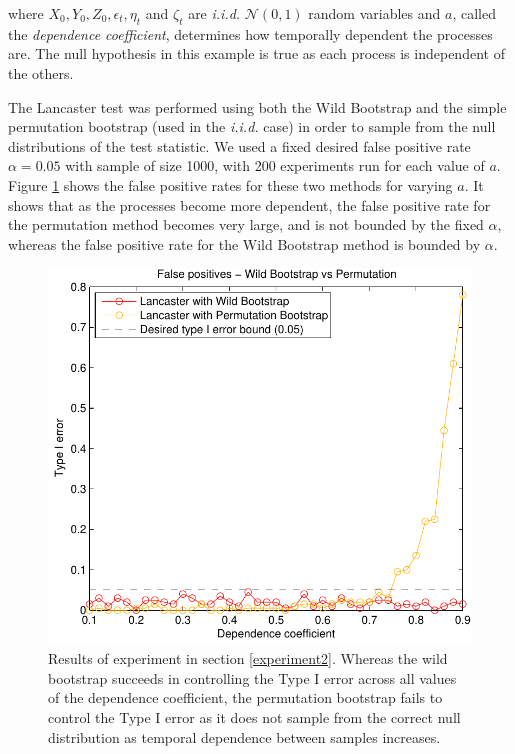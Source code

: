 \documentclass[]{article}
\begin{document}
where $X_0, Y_0, Z_0, \epsilon_t, \eta_t$ and $\zeta_t$ are \emph{i.i.d.} $\mathcal{N}(0,1)$ random variables and $a$, called the \emph{dependence coefficient}, determines how temporally dependent the processes are. The null hypothesis in this example is true as each process is independent of the others.

The Lancaster test was performed using both the Wild Bootstrap and the simple permutation bootstrap (used in the \emph{i.i.d.} case) in order to sample from the null distributions of the test statistic. We used a fixed desired false positive rate $\alpha = 0.05$ with sample of size 1000, with 200 experiments run for each value of $a$. Figure \ref{wildBootstrap_is_necessary} shows the false positive rates for these two methods for varying $a$. It shows that as the processes become more dependent, the false positive rate for the permutation method becomes very large, and is not bounded by the fixed $\alpha$, whereas the false positive rate for the Wild Bootstrap method is bounded by $\alpha$.
\begin{figure}[ht]
\vskip 0.2in
\begin{center}
\centerline{\includegraphics[scale=0.6]{UAI_Figure2.pdf}}
\caption{Results of experiment in section \ref{experiment2}. Whereas the wild bootstrap succeeds in controlling the Type I error across all values of the dependence coefficient, the permutation bootstrap fails to control the Type I error as it does not sample from the correct null distribution as temporal dependence between samples increases.}
\label{wildBootstrap_is_necessary}
\end{center}
\vskip -0.2in
\end{figure} 
\end{document}
